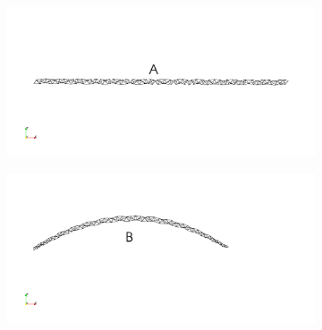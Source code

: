 \begin{figure}
\begin{subfigure}{.5\textwidth}
  \centering
  \includegraphics[width=.8\linewidth]{./chap_5_active_trusses/images_non_linear_time_dependent_constitutive_equatio/linear_tetrahedral_bending_snapshop_A.png}  
  \label{fig:sfigA}
\end{subfigure}%
\begin{subfigure}{.5\textwidth}
  \centering
  \includegraphics[width=.8\linewidth]{./chap_5_active_trusses/images_non_linear_time_dependent_constitutive_equatio/linear_tetrahedral_bending_snapshop_B.png}
  
  \label{fig:sfigB}
\end{subfigure}


\end{figure}
